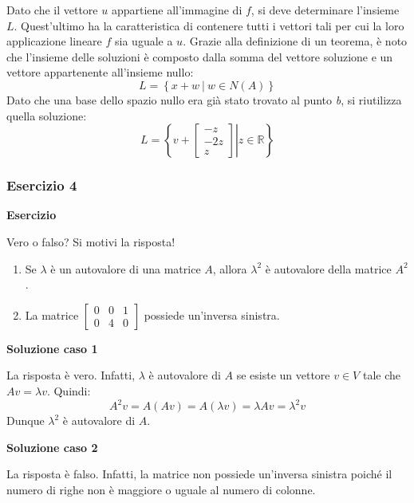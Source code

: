 \documentclass[a4paper]{article}
\begin{document}
	Dato che il vettore $u$ appartiene all'immagine di $f$, si deve determinare l'insieme $L$. Quest'ultimo ha la caratteristica di contenere tutti i vettori tali per cui la loro applicazione lineare $f$ sia uguale a $u$. Grazie alla definizione di un teorema, è noto che l'insieme delle soluzioni è composto dalla somma del vettore soluzione e un vettore appartenente all'insieme nullo:
	\begin{equation*}
		L = \left\{x + w \: | \: w \in N\left(A\right)\right\}
	\end{equation*}
	Dato che una base dello spazio nullo era già stato trovato al punto \emph{b}, si riutilizza quella soluzione:
	\begin{equation*}
		L = \left\{\left. v + \begin{bmatrix}
			-z \\
			-2z \\
			z
		\end{bmatrix} \right| z \in \mathbb{R}\right\}
	\end{equation*}\newpage

	\subsubsection{Esercizio 4}
	
	\textcolor{Red3}{\textbf{Esercizio}}\newline
	
	\noindent
	Vero o falso? Si motivi la risposta!
	
	\begin{enumerate}
		\item Se $\lambda$ è un autovalore di una matrice $A$, allora $\lambda^{2}$ è autovalore della matrice $A^{2}$.
		
		\item La matrice $\begin{bmatrix}
				0 & 0 & 1 \\
				0 & 4 & 0
			\end{bmatrix}$ possiede un'inversa sinistra.
	\end{enumerate}
	
	\noindent
	\textcolor{Green4}{\textbf{Soluzione caso 1}}\newline
	
	\noindent
	La risposta è vero. Infatti, $\lambda$ è autovalore di $A$ se esiste un vettore $v \in V$ tale che $Av = \lambda v$. Quindi:
	\begin{equation*}
		A^{2}v = A\left(Av\right) = A\left(\lambda v\right) = \lambda{Av} = \lambda^{2}v
	\end{equation*}
	Dunque $\lambda^{2}$ è autovalore di $A$.\newline
	
	\noindent
	\textcolor{Green4}{\textbf{Soluzione caso 2}}\newline
	
	\noindent
	La risposta è falso. Infatti, la matrice non possiede un'inversa sinistra poiché il numero di righe non è maggiore o uguale al numero di colonne.
\end{document}
